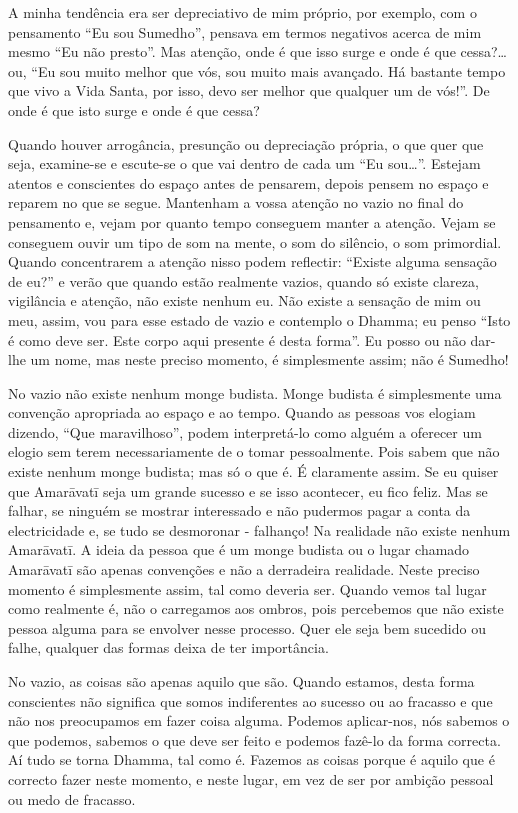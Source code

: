A minha tendência era ser depreciativo de mim próprio, por exemplo, com o
pensamento “Eu sou Sumedho”, pensava em termos negativos acerca de mim mesmo “Eu
não presto”. Mas atenção, onde é que isso surge e onde é que cessa?\ldots{} ou,
“Eu sou muito melhor que vós, sou muito mais avançado. Há bastante tempo que
vivo a Vida Santa, por isso, devo ser melhor que qualquer um de vós!”. De onde é
que isto surge e onde é que cessa?

Quando houver arrogância, presunção ou depreciação própria, o que quer que seja,
examine-se e escute-se o que vai dentro de cada um “Eu sou\ldots{}”. Estejam
atentos e conscientes do espaço antes de pensarem, depois pensem no espaço e
reparem no que se segue. Mantenham a vossa atenção no vazio no final do
pensamento e, vejam por quanto tempo conseguem manter a atenção. Vejam se
conseguem ouvir um tipo de som na mente, o som do silêncio, o som primordial.
Quando concentrarem a atenção nisso podem reflectir: “Existe alguma sensação de
eu?” e verão que quando estão realmente vazios, quando só existe clareza,
vigilância e atenção, não existe nenhum eu. Não existe a sensação de mim ou meu,
assim, vou para esse estado de vazio e contemplo o Dhamma; eu penso “Isto é como
deve ser. Este corpo aqui presente é desta forma”. Eu posso ou não dar-lhe um
nome, mas neste preciso momento, é simplesmente assim; não é Sumedho!

No vazio não existe nenhum monge budista. Monge budista é simplesmente uma
convenção apropriada ao espaço e ao tempo. Quando as pessoas vos elogiam
dizendo, “Que maravilhoso”, podem interpretá-lo como alguém a oferecer um elogio
sem terem necessariamente de o tomar pessoalmente. Pois sabem que não existe
nenhum monge budista; mas só o que é. É claramente assim. Se eu quiser que
Amarāvatī seja um grande sucesso e se isso acontecer, eu fico feliz. Mas se
falhar, se ninguém se mostrar interessado e não pudermos pagar a conta da
electricidade e, se tudo se desmoronar - falhanço! Na realidade não existe
nenhum Amarāvatī. A ideia da pessoa que é um monge budista ou o lugar chamado
Amarāvatī são apenas convenções e não a derradeira realidade. Neste preciso
momento é simplesmente assim, tal como deveria ser. Quando vemos tal lugar como
realmente é, não o carregamos aos ombros, pois percebemos que não existe pessoa
alguma para se envolver nesse processo. Quer ele seja bem sucedido ou falhe,
qualquer das formas deixa de ter importância.

No vazio, as coisas são apenas aquilo que são. Quando estamos, desta forma
conscientes não significa que somos indiferentes ao sucesso ou ao fracasso e que
não nos preocupamos em fazer coisa alguma. Podemos aplicar-nos, nós sabemos o
que podemos, sabemos o que deve ser feito e podemos fazê-lo da forma correcta.
Aí tudo se torna Dhamma, tal como é. Fazemos as coisas porque é aquilo que é
correcto fazer neste momento, e neste lugar, em vez de ser por ambição pessoal
ou medo de fracasso.


